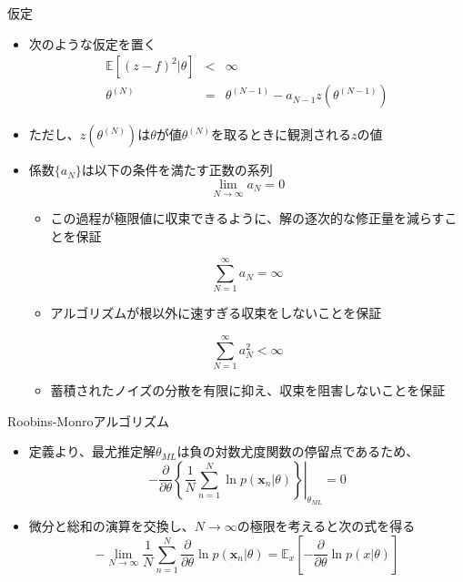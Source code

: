 \begin{frame}{仮定}
 \begin{itemize}
  \item 次のような仮定を置く
        \begin{eqnarray}
         \mathbb{E}[(z-f)^2|\theta] &<& \infty\\
         \theta^{(N)}&=& \theta^{(N-1)}-a_{N-1}z(\theta^{(N-1)})
        \end{eqnarray}
  \item ただし、$z(\theta^{(N)})$は$\theta$が値$\theta^{(N)}$を取るときに観測される$z$の値
  \item 係数$\{a_N\}$は以下の条件を満たす正数の系列
        \begin{equation}
         \lim_{N \rightarrow \infty}a_N=0
        \end{equation}
        \begin{itemize}
         \item この過程が極限値に収束できるように、解の逐次的な修正量を減らすことを保証
        \end{itemize}
        \begin{equation}
         \sum_{N=1}^{\infty}a_N=\infty
        \end{equation}
        \begin{itemize}
         \item アルゴリズムが根以外に速すぎる収束をしないことを保証
        \end{itemize}
        \begin{equation}
         \sum_{N=1}^{\infty}a_N^2 < \infty
        \end{equation}
        \begin{itemize}
         \item 蓄積されたノイズの分散を有限に抑え、収束を阻害しないことを保証
        \end{itemize}
 \end{itemize}
\end{frame}

\begin{frame}{Roobins-Monroアルゴリズム}
 \begin{itemize}
  \item 定義より、最尤推定解$\theta_{ML}$は負の対数尤度関数の停留点であるため、
        \begin{equation}
         -\frac{\partial }{\partial \theta}\left\{\left.\frac{1}{N}\sum_{n=1}^{N}\ln  p(\bm{x}_n|\theta)\right\}\right|_{\theta_{ML}} = 0
        \end{equation}
  \item 微分と総和の演算を交換し、$N\rightarrow\infty$の極限を考えると次の式を得る
        \begin{equation}
         -\lim_{N \rightarrow \infty}\frac{1}{N}\sum_{n=1}^{N}\frac{\partial}{\partial \theta}\ln p(\bm{x}_n|\theta)=\mathbb{E}_x\left[-\frac{\partial}{\partial \theta}\ln p(x|\theta)\right]
        \end{equation}
 \end{itemize}
\end{frame}

